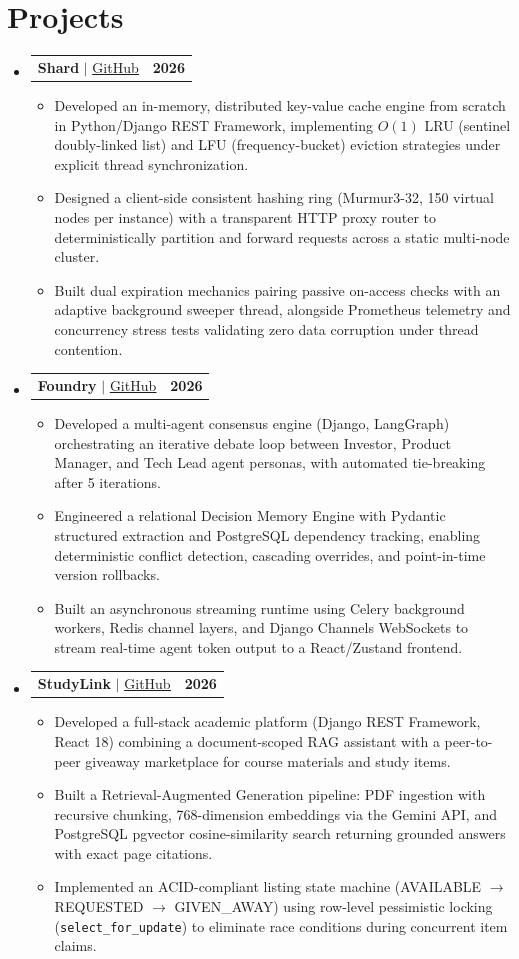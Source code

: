 \documentclass[letterpaper,10pt]{article}
\makeatletter
\newcommand{\resumeItem}[1]{
  \item\small{
    {#1 \vspace{-2pt}}
  }
}
\newcommand{\resumeProjectHeading}[2]{
    \item
    \begin{tabular*}{1.001\textwidth}{l@{\extracolsep{\fill}}r}
      \small#1 & \textbf{\small #2}\\
    \end{tabular*}\vspace{-7pt}
}
\newcommand{\resumeSubHeadingListStart}{\begin{itemize}[leftmargin=0.0in, label={}]}
\newcommand{\resumeSubHeadingListEnd}{\end{itemize}}
\newcommand{\resumeItemListStart}{\begin{itemize}}
\newcommand{\resumeItemListEnd}{\end{itemize}\vspace{-5pt}}
\makeatother
\begin{document}
\section{Projects}
    \vspace{-5pt}
    \resumeSubHeadingListStart
\resumeProjectHeading
    {\textbf{Shard} $|$ \href{https://github.com/vaibhv19/Shard}{\underline{GitHub}}}{2026}
    \resumeItemListStart
        \resumeItem{Developed an in-memory, distributed key-value cache engine from scratch in Python/Django REST Framework, implementing $O(1)$ LRU (sentinel doubly-linked list) and LFU (frequency-bucket) eviction strategies under explicit thread synchronization.}
        \resumeItem{Designed a client-side consistent hashing ring (Murmur3-32, 150 virtual nodes per instance) with a transparent HTTP proxy router to deterministically partition and forward requests across a static multi-node cluster.}
        \resumeItem{Built dual expiration mechanics pairing passive on-access checks with an adaptive background sweeper thread, alongside Prometheus telemetry and concurrency stress tests validating zero data corruption under thread contention.}
    \resumeItemListEnd          \vspace{-13pt}
  \resumeProjectHeading
    {\textbf{Foundry} $|$ \href{https://github.com/vaibhv19/Foundry}{\underline{GitHub}}}{2026}
    \resumeItemListStart
        \resumeItem{Developed a multi-agent consensus engine (Django, LangGraph) orchestrating an iterative debate loop between Investor, Product Manager, and Tech Lead agent personas, with automated tie-breaking after 5 iterations.}
        \resumeItem{Engineered a relational Decision Memory Engine with Pydantic structured extraction and PostgreSQL dependency tracking, enabling deterministic conflict detection, cascading overrides, and point-in-time version rollbacks.}
        \resumeItem{Built an asynchronous streaming runtime using Celery background workers, Redis channel layers, and Django Channels WebSockets to stream real-time agent token output to a React/Zustand frontend.}
    \resumeItemListEnd
          \vspace{-13pt}
          \resumeProjectHeading
    {\textbf{StudyLink} $|$ \href{https://github.com/vaibhv19/StudyLink}{\underline{GitHub}}}{2026}
    \resumeItemListStart
        \resumeItem{Developed a full-stack academic platform (Django REST Framework, React 18) combining a document-scoped RAG assistant with a peer-to-peer giveaway marketplace for course materials and study items.}
        \resumeItem{Built a Retrieval-Augmented Generation pipeline: PDF ingestion with recursive chunking, 768-dimension embeddings via the Gemini API, and PostgreSQL pgvector cosine-similarity search returning grounded answers with exact page citations.}
        \resumeItem{Implemented an ACID-compliant listing state machine (AVAILABLE $\rightarrow$ REQUESTED $\rightarrow$ GIVEN\_AWAY) using row-level pessimistic locking (\texttt{select\_for\_update}) to eliminate race conditions during concurrent item claims.}
    \resumeItemListEnd
    \resumeSubHeadingListEnd
\vspace{-12pt}
\end{document}
